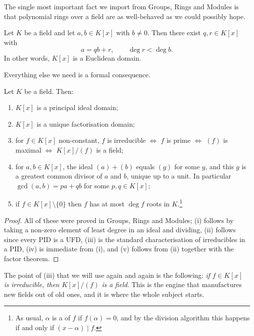 \documentclass[a4paper]{scrartcl}
\begin{document}
The single most important fact we import from Groups, Rings and Modules is that polynomial rings over a field are as well-behaved as we could possibly hope.

\begin{theorem}
	Let $K$ be a field and let $a, b \in K[x]$ with $b \neq 0$. Then there exist $q, r \in K[x]$ with
	$$a = qb + r, \qquad \deg r < \deg b.$$
	In other words, $K[x]$ is a Euclidean domain.
\end{theorem}

Everything else we need is a formal consequence.

\begin{corollary}
	Let $K$ be a field. Then:
	\begin{enumerate}[label=(\roman*)]
		\item $K[x]$ is a principal ideal domain;
		\item $K[x]$ is a unique factorisation domain;
		\item for $f \in K[x]$ non-constant, $f$ is irreducible $\iff$ $f$ is prime $\iff$ $(f)$ is maximal $\iff$ $K[x]/(f)$ is a field;
		\item for $a, b \in K[x]$, the ideal $(a) + (b)$ equals $(g)$ for some $g$, and this $g$ is a greatest common divisor of $a$ and $b$, unique up to a unit. In particular $\gcd(a,b) = pa + qb$ for some $p, q \in K[x]$;
		\item if $f \in K[x] \setminus \{0\}$ then $f$ has at most $\deg f$ roots in $K$.\footnote{As usual, $\alpha$ is a  of $f$ if $f(\alpha) = 0$, and by the division algorithm this happens if and only if $(x - \alpha) \mid f$.}
	\end{enumerate}
\end{corollary}

\begin{proof}
	All of these were proved in Groups, Rings and Modules; (i) follows by taking a non-zero element of least degree in an ideal and dividing, (ii) follows since every PID is a UFD, (iii) is the standard characterisation of irreducibles in a PID, (iv) is immediate from (i), and (v) follows from (ii) together with the factor theorem.
\end{proof}

The point of (iii) that we will use again and again is the following: \emph{if $f \in K[x]$ is irreducible, then $K[x]/(f)$ is a field}. This is the engine that manufactures new fields out of old ones, and it is where the whole subject starts.
\end{document}
